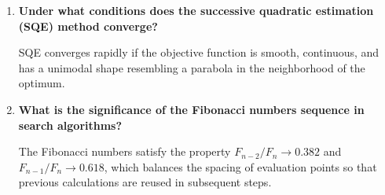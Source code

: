 \documentclass[12pt,a4paper]{article}
\newcommand{\Q}[1]{\textbf{#1}\par\noindent\ignorespaces}
\begin{document}
\begin{tcolorbox}[exambox, title={\textbf{Frequently Asked / Viva Questions}}]
\begin{enumerate}[topsep=0pt, label=\textbf{Q\arabic*.}, itemsep=5pt]
  \item \Q{Under what conditions does the successive quadratic estimation (SQE) method converge?}
    SQE converges rapidly if the objective function is smooth, continuous, and has a unimodal shape resembling a parabola in the neighborhood of the optimum.
  \item \Q{What is the significance of the Fibonacci numbers sequence in search algorithms?}
    The Fibonacci numbers satisfy the property $F_{n-2}/F_n \to 0.382$ and $F_{n-1}/F_n \to 0.618$, which balances the spacing of evaluation points so that previous calculations are reused in subsequent steps.
\end{enumerate}
\end{tcolorbox}
\end{document}
